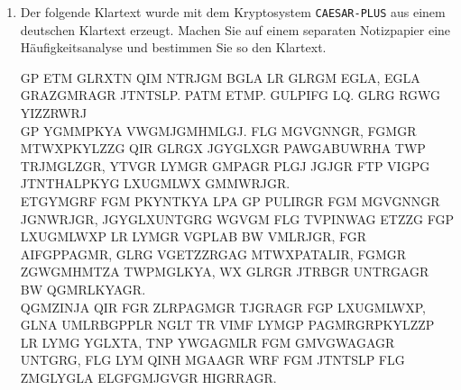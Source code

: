 \begin{enumerate}
\newpage

\item Der folgende Klartext wurde mit dem Kryptosystem \texttt{CAESAR-PLUS} aus einem deutschen Klartext erzeugt. Machen Sie auf einem separaten Notizpapier eine Häufigkeitsanalyse und bestimmen Sie so den Klartext.

\begin{spacing}{3.25}
\resetlinenumber[1]
\begin{linenumbers}
\ttfamily
GP ETM GLRXTN QIM NTRJGM BGLA LR GLRGM EGLA, EGLA GRAZGMRAGR JTNTSLP. PATM ETMP. GULPIFG LQ. GLRG RGWG YIZZRWRJ\\
GP YGMMPKYA VWGMJGMHMLGJ. FLG MGVGNNGR, FGMGR MTWXPKYLZZG QIR GLRGX JGYGLXGR PAWGABUWRHA TWP TRJMGLZGR, YTVGR LYMGR GMPAGR PLGJ JGJGR FTP VIGPG JTNTHALPKYG LXUGMLWX GMMWRJGR.\\
ETGYMGRF FGM PKYNTKYA LPA GP PULIRGR FGM MGVGNNGR JGNWRJGR, JGYGLXUNTGRG WGVGM FLG TVPINWAG ETZZG FGP LXUGMLWXP LR LYMGR VGPLAB BW VMLRJGR, FGR AIFGPPAGMR, GLRG VGETZZRGAG MTWXPATALIR, FGMGR ZGWGMHMTZA TWPMGLKYA, WX GLRGR JTRBGR UNTRGAGR BW QGMRLKYAGR.\\
QGMZINJA QIR FGR ZLRPAGMGR TJGRAGR FGP LXUGMLWXP, GLNA UMLRBGPPLR NGLT TR VIMF LYMGP PAGMRGRPKYLZZP LR LYMG YGLXTA, TNP YWGAGMLR FGM GMVGWAGAGR UNTGRG, FLG LYM QINH MGAAGR WRF FGM JTNTSLP FLG ZMGLYGLA ELGFGMJGVGR HIGRRAGR.
\end{linenumbers}
\end{spacing}

%

\end{enumerate}
